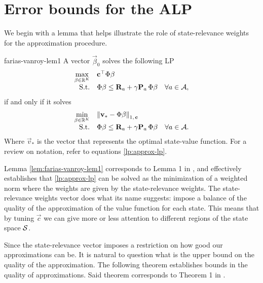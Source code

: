 \section{Error bounds for the ALP}

We begin with a lemma that helps illustrate the role of state-relevance weights
for the approximation procedure.

\begin{lemma}{}{farias-vanroy-lem1}
    A vector $\vec{\beta}_0$ solves the following LP
    \[
    \begin{array}{rl@{}ll}
        \displaystyle \max_{\vec{\beta} \in \R^{K}} & \vec{c}^{\top} \Phi \vec{\beta} \\
        \text{S.t.} & \displaystyle \Phi \vec{\beta} \leq \vec{R}_a + \gamma \vec{P}_a \, \Phi \vec{\beta} & \quad \forall a \in \Actions, \\
    \end{array}
    \]
    if and only if it solves
    \[
    \begin{array}{rl@{}ll}
        \displaystyle \min_{\vec{\beta} \in \R^{K}} & \left\| \vec{v}_* - \Phi \vec{\beta} \right\|_{1, \, \vec{c}} \\
        \text{S.t.} & \displaystyle \Phi \vec{\beta} \leq \vec{R}_a + \gamma \vec{P}_a \, \Phi \vec{\beta} & \quad \forall a \in \Actions. \\
    \end{array}
    \]
    Where $\vec{v}_*$ is the vector that represents the optimal state-value
    function. For a review on notation, refer to equations \ref{lp:approx-lp}.
\end{lemma}

Lemma \ref{lem:farias-vanroy-lem1} corresponds to Lemma 1 in
\Cite[pg.~853]{farias2003LP2ADP}, and effectively establishes that
\eqref{lp:approx-lp} can be solved as the minimization of a weighted norm where
the weights are given by the state-relevance weights. The state-relevance
weights vector does what its name suggests: impose a balance of the quality of
the approximation of the value function for each state. This means that by
tuning $\vec{c}$ we can give more or less attention to different regions of the
state space $\mathcal{S}$.

Since the state-relevance vector imposes a restriction on how good our
approximations can be. It is natural to question what is the upper bound on the
quality of the approximation. The following theorem establishes bounds in the
quality of approximations. Said theorem corresponds to Theorem 1 in
\Cite[pg.~853]{farias2003LP2ADP}.

